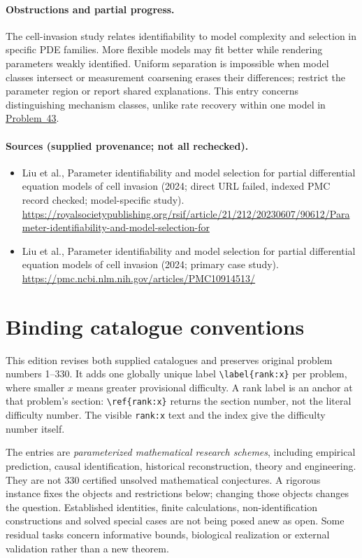 \documentclass[11pt]{article}
\begin{document}
\paragraph{Obstructions and partial progress.} The cell-invasion study relates identifiability to model complexity and selection in specific PDE families. More flexible models may fit better while rendering parameters weakly identified. Uniform separation is impossible when model classes intersect or measurement coarsening erases their differences; restrict the parameter region or report shared explanations. This entry concerns distinguishing mechanism classes, unlike rate recovery within one model in \href{https://we-solve.github.io/problems/structural-parameter-identifiability-657575ff/}{Problem~43}.
\paragraph{Sources (supplied provenance; not all rechecked).}
\begin{itemize}
\item Liu et al., Parameter identifiability and model selection for partial differential equation models of cell invasion (2024; direct URL failed, indexed PMC record checked; model-specific study). \url{https://royalsocietypublishing.org/rsif/article/21/212/20230607/90612/Parameter-identifiability-and-model-selection-for}
\item Liu et al., Parameter identifiability and model selection for partial differential equation models of cell invasion (2024; primary case study). \url{https://pmc.ncbi.nlm.nih.gov/articles/PMC10914513/}
\end{itemize}


\section*{Binding catalogue conventions}
This edition revises both supplied catalogues and preserves original problem numbers 1--330. It adds one globally unique label \verb|\label{rank:x}| per problem, where smaller $x$ means greater provisional difficulty. A rank label is an anchor at that problem's section: \verb|\ref{rank:x}| returns the section number, not the literal difficulty number. The visible \texttt{rank:x} text and the index give the difficulty number itself.

The entries are \emph{parameterized mathematical research schemes}, including empirical prediction, causal identification, historical reconstruction, theory and engineering. They are not 330 certified unsolved mathematical conjectures. A rigorous instance fixes the objects and restrictions below; changing those objects changes the question. Established identities, finite calculations, non-identification constructions and solved special cases are not being posed anew as open. Some residual tasks concern informative bounds, biological realization or external validation rather than a new theorem.
\end{document}
